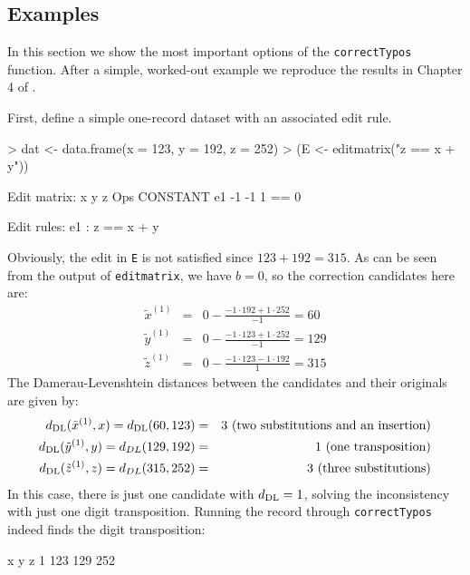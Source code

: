 \documentclass[11pt, fleqn, a4paper]{article}
\begin{document}
\subsection{Examples}
In this section we show the most important options of the {\tt correctTypos}
function.  After a simple, worked-out example we reproduce the results in
Chapter 4 of \cite{scholtus:2009}.

First, define a simple one-record dataset with an associated edit rule.
\begin{Schunk}
\begin{Sinput}
> dat <- data.frame(x = 123, y = 192, z = 252)
> (E <- editmatrix("z == x + y"))
\end{Sinput}
\begin{Soutput}
Edit matrix:
    x  y z Ops CONSTANT
e1 -1 -1 1  ==        0

Edit rules:
e1 : z == x + y  
\end{Soutput}
\end{Schunk}
Obviously, the edit in {\tt E} is not satisfied since $123+192=315$. As can be
seen from the output of {\tt editmatrix}, we have $b=0$, so the correction
candidates here are:
\begin{eqnarray}
\tilde{x}^{(1)} &=& 0 - \frac{-1\cdot 192+1\cdot252}{-1} = 60\\
\tilde{y}^{(1)} &=& 0 - \frac{-1\cdot 123+1\cdot252}{-1} = 129\\
\tilde{z}^{(1)} &=& 0 - \frac{-1\cdot 123-1\cdot192}{1} = 315 
\end{eqnarray}
The Damerau-Levenshtein distances between the candidates and their originals
are given by:
\begin{eqnarray}
d_{\rm DL}(\tilde{x}^{(1)},x) = d_{\rm DL}(60,123) &=& 3\textrm{ (two substitutions and an insertion)}\\
d_{\rm DL}(\tilde{y}^{(1)},y) = d_{ DL}(129,192)   &=& 1\textrm{ (one transposition)}\\
d_{\rm DL}(\tilde{z}^{(1)},z) = d_{ DL}(315,252)   &=& 3\textrm{ (three substitutions)}
\end{eqnarray}
In this case, there is just one candidate with $d_{\rm DL}=1$, solving the 
inconsistency with just one digit transposition. Running the record through 
{\tt correctTypos} indeed finds the digit transposition:
\begin{Schunk}
\begin{Soutput}
    x   y   z
1 123 129 252
\end{Soutput}
\end{Schunk}
\end{document}
